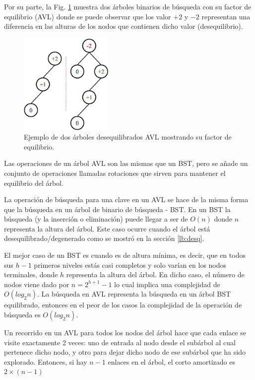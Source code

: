 Por su parte, la Fig. \ref{fig:AVLExample2} muestra dos árboles binarios de búsqueda con su factor de equilibrio (AVL) donde se puede observar que los valor $+2$ y $-2$ representan una diferencia en las alturas de los nodos que contienen dicho valor (desequilibrio).

\begin{figure}[htpb!]
  \begin{center}
    \includegraphics[width=0.4\textwidth]{images/AVLExample2.eps}
  \end{center}
  \caption{Ejemplo de dos árboles desequilibrados AVL mostrando su factor de equilibrio.}
  \label{fig:AVLExample2}
\end{figure}

Las operaciones de un árbol AVL son las mismas que un BST, pero se añade un conjunto de operaciones llamadas rotaciones que sirven para mantener el equilibrio del árbol.

La operación de búsqueda para una clave en un AVL se hace de la misma forma que la búsqueda en un árbol de binario de búsqueda - BST. En un BST la búsqueda (y la inserción o eliminación) puede llegar a ser de $O(n)$ donde $n$ representa la altura del árbol. Este caso ocurre cuando el árbol está desequilibrado/degenerado como se mostró en la sección \ref{lb:desq}.

El mejor caso de un BST es cuando es de altura mínima, es decir, que en todos sus $h-1$ primeros niveles estás casi completos y solo varían en los nodos terminales, donde $h$ representa la altura del árbol. En dicho caso, el número de nodos viene dado por $n = 2^{h+1}-1$ lo cual implica una complejidad de $O(log_2n)$. La búsqueda en AVL representa la búsqueda en un árbol BST equilibrado, entonces en el peor de los casos la complejidad de la operación de búsqueda es $O(log_2n)$.

Un recorrido en un AVL para todos los nodos del árbol hace que cada enlace se visite exactamente 2 veces: uno de entrada al nodo desde el subárbol al cual pertenece dicho nodo, y otro para dejar dicho nodo de ese subárbol que ha sido explorado. Entonces, si hay $n-1$ enlaces en el árbol, el corto amortizado es $2 \times (n-1)$

